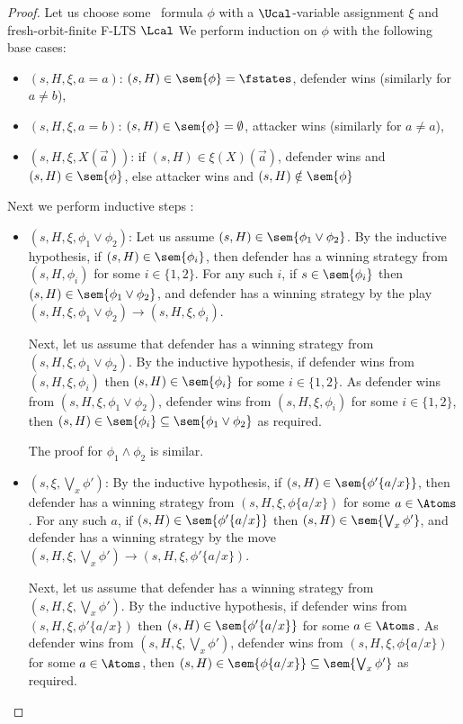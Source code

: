 \begin{proof}
	Let us choose some \fhml\ formula $\phi$ with a $\Ucal$-variable assignment $\xi$ and fresh-orbit-finite F-LTS $\Lcal$
	We perform 
	induction on $\phi$ with the following base cases:
	\begin{itemize}
		\item $(s, H, \xi, a = a)$: $(s, H)\in\sem{\phi} = \fstates$, defender wins (similarly for $a \neq b$),
		\item $(s, H, \xi, a = b)$: $(s, H)\in\sem{\phi} = \emptyset$, attacker wins (similarly for $a \neq a$),
		\item $(s, H, \xi, X(\vec a))$: if $(s, H)\in \xi(X)(\vec a)$, defender wins and $(s, H) \in \sem{\phi}$, else attacker wins and $(s, H)\notin \sem{\phi}$
	\end{itemize}
	Next we perform inductive steps :
	\begin{itemize}
		\item $(s, H, \xi, \phi_1 \lor \phi_2)$:
		Let us assume $(s, H) \in \sem{\phi_1 \lor \phi_2}$.
		By the inductive hypothesis, if $(s, H) \in \sem{\phi_i}$, then defender has a winning strategy from $(s, H, \phi_i)$ for some $i \in \{1, 2\}$. 
		For any such $i$, if $s \in \sem{\phi_i}$ then $(s, H)\in \sem{\phi_1 \lor \phi_2}$, and defender has a winning strategy by the play $
		(s, H, \xi, \phi_1 \lor \phi_2) \rightarrow (s, H, \xi, \phi_i)$.
		
		Next, let us assume that defender has a winning strategy from $(s, H, \xi, \phi_1 \lor \phi_2)$. 
		By the inductive hypothesis, if defender wins from $(s, H, \xi, \phi_i)$ then $(s, H)\in \sem{\phi_i}$ for some $i \in \{1, 2\}$.
		As defender wins from $(s, H, \xi, \phi_1 \lor \phi_2)$, defender wins from $(s, H, \xi, \phi_i)$ for some $i \in \{1, 2\}$, then $(s, H) \in \sem{\phi_i} \subseteq \sem{\phi_1 \lor \phi_2}$ as required.
		
		The proof for $\phi_1 \land \phi_2$ is similar.
		\item $(s, \xi, \bigvee_x \phi')$: 
		By the inductive hypothesis, if $(s, H)\in \sem{\phi'\{a/x\}}$, then defender has a winning strategy from $(s, H, \xi, \phi\{a/x\})$ for some $a \in \Atoms$.
		For any such $a$, if $(s, H)\in \sem{\phi'\{a/x\}}$ then $(s, H) \in \sem{\bigvee_x \phi'}$, and defender has a winning strategy by the move $(s, H, \xi, \bigvee_x \phi') \rightarrow (s, H, \xi, \phi'\{a/x\})$.
		
		Next, let us assume that defender has a winning strategy from $(s, H, \xi, \bigvee_x \phi')$. 
		By the inductive hypothesis, if defender wins from $(s, H, \xi, \phi'\{a/x\})$ then $(s, H) \in \sem{\phi'\{a/x\}}$ for some $a \in \Atoms$.
		As defender wins from $(s, H, \xi, \bigvee_x \phi')$, defender wins from $(s, H, \xi, \phi\{a/x\})$ for some $a \in \Atoms$, then $(s, H) \in \sem{\phi\{a/x\}} \subseteq \sem{\bigvee_x \phi'}$ as required.
		

\end{itemize}
\end{proof}
